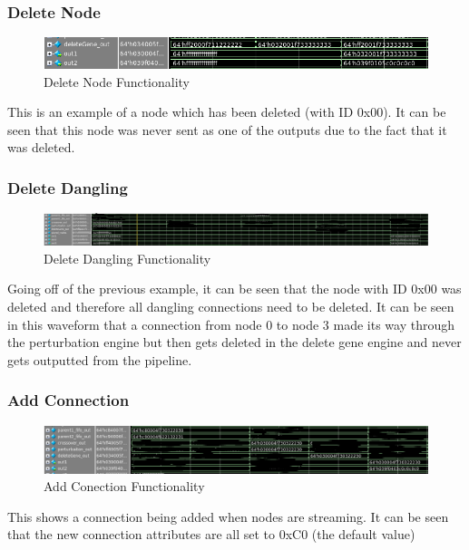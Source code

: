 \documentclass[preprint,pre,floats,aps,amsmath,amssymb]{revtex4}
\begin{document}
\newpage
\subsubsection{Delete Node}

\begin{figure}[htb!]
	\includegraphics[width=\textwidth]{DeleteNode}
	\caption{Delete Node Functionality}
\end{figure}
\FloatBarrier
This is an example of a node which has been deleted (with ID 0x00). It can be seen that this node was never sent as one of the outputs due to the fact that it was deleted.

\subsubsection{Delete Dangling}

\begin{figure}[htb!]
	\includegraphics[width=\textwidth]{DeleteDangling}
	\caption{Delete Dangling Functionality}
\end{figure}
\FloatBarrier
Going off of the previous example, it can be seen that the node with ID 0x00 was deleted and therefore all dangling connections need to be deleted. It can be seen in this waveform that a connection from node 0 to node 3 made its way through the perturbation engine but then gets deleted in the delete gene engine and never gets outputted from the pipeline.

\subsubsection{Add Connection}

\begin{figure}[htb!]
	\includegraphics[width=\textwidth]{AddConnection}
	\caption{Add Conection Functionality}
\end{figure}
\FloatBarrier
This shows a connection being added when nodes are streaming. It can be seen that the new connection attributes are all set to 0xC0 (the default value)
\end{document}
